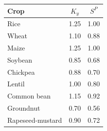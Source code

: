 \begin{tabular}{lcc}
\toprule
Crop & $K_y$ & $S^{P}$\\
\midrule
Rice & 1.25 & 1.00 \\
Wheat & 1.10 & 0.88 \\
Maize & 1.25 & 1.00 \\
Soybean & 0.85 & 0.68 \\
Chickpea & 0.88 & 0.70 \\
Lentil & 1.00 & 0.80 \\
Common bean & 1.15 & 0.92 \\
Groundnut & 0.70 & 0.56 \\
Rapeseed-mustard & 0.90 & 0.72 \\
\bottomrule
\end{tabular}
